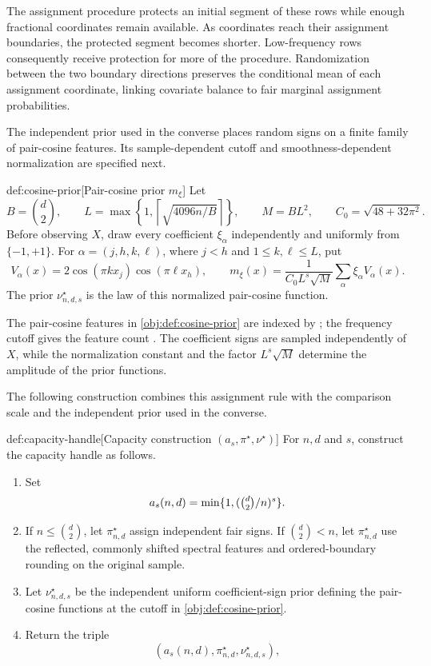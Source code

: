 The assignment procedure protects an initial segment of these rows while enough fractional coordinates remain available. As coordinates reach their assignment boundaries, the protected segment becomes shorter. Low-frequency rows consequently receive protection for more of the procedure. Randomization between the two boundary directions preserves the conditional mean of each assignment coordinate, linking covariate balance to fair marginal assignment probabilities.

The independent prior used in the converse places random signs on a finite family of pair-cosine features. Its sample-dependent cutoff and smoothness-dependent normalization are specified next.

\begin{definitionv}{def:cosine-prior}[Pair-cosine prior \(m_\xi\)]
Let
\[
B=\binom d2,\qquad
L=\max\left\{1,\left\lceil\sqrt{4096n/B}\right\rceil\right\},\qquad
M=BL^2,\qquad
C_0=\sqrt{48+32\pi^2}.
\]
Before observing \(X\), draw every coefficient \(\xi_\alpha\) independently and uniformly from \(\{-1,+1\}\). For \(\alpha=(j,h,k,\ell)\), where \(j<h\) and \(1\leq k,\ell\leq L\), put
\[
V_\alpha(x)=2\cos(\pi kx_j)\cos(\pi\ell x_h),
\qquad
m_\xi(x)=\frac{1}{C_0L^s\sqrt M}\sum_\alpha\xi_\alpha V_\alpha(x).
\]
The prior \(\nu^\star_{n,d,s}\) is the law of this normalized pair-cosine function.
\end{definitionv}

The pair-cosine features  in \cref{obj:def:cosine-prior} are indexed by ; the frequency cutoff  gives the feature count . The coefficient signs  are sampled independently of \(X\), while the normalization constant  and the factor \(L^s\sqrt M\) determine the amplitude of the prior functions.

The following construction combines this assignment rule with the comparison scale and the independent prior used in the converse.

\begin{algorithmv}{def:capacity-handle}[Capacity construction \((a_s,\pi^\star,\nu^\star)\)]
For \(n,d\) and \(s\), construct the capacity handle as follows.
\begin{enumerate}
\item Set
\[
a_s(n,d)=\min\{1,(\tbinom d2/n)^s\}.
\]
\item If \(n\leq\binom d2\), let \(\pi^\star_{n,d}\) assign independent fair signs. If \(\binom d2<n\), let \(\pi^\star_{n,d}\) use the reflected, commonly shifted spectral features and ordered-boundary rounding on the original sample.
\item Let \(\nu^\star_{n,d,s}\) be the independent uniform coefficient-sign prior defining the pair-cosine functions at the cutoff in \cref{obj:def:cosine-prior}.
\item Return the triple
\[
(a_s(n,d),\pi^\star_{n,d},\nu^\star_{n,d,s}),
\]
\end{enumerate}
\end{algorithmv}

